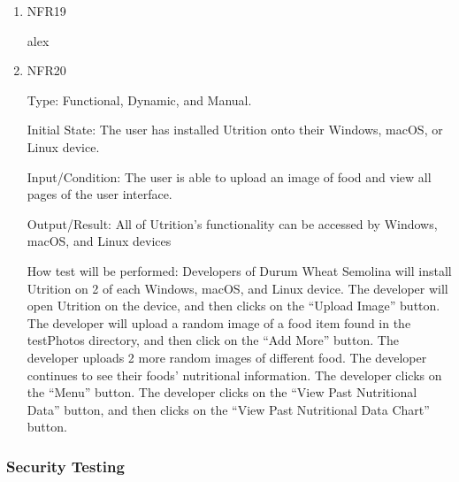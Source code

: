 \documentclass[12pt, titlepage]{article}
\begin{document}
\begin{enumerate}

\item{NFR19\\} 

alex


\item{NFR20\\} 

Type: Functional, Dynamic, and Manual.

Initial State: The user has installed Utrition onto their Windows, macOS, or Linux device.

Input/Condition: The user is able to upload an image of food and view all pages of the user interface.

Output/Result: All of Utrition’s functionality can be accessed by Windows, macOS, and Linux devices

How test will be performed: Developers of Durum Wheat Semolina will install Utrition on 2 of each Windows, macOS, and Linux device. The developer will open Utrition on the device, and then clicks on the “Upload Image” button. The developer will upload a random image of a food item found in the testPhotos directory, and then click on the “Add More” button. The developer uploads 2 more random images of different food. The developer continues to see their foods’ nutritional information. The developer clicks on the “Menu” button. The developer clicks on the “View Past Nutritional Data” button, and then clicks on the “View Past Nutritional Data Chart” button.

\end{enumerate}

\subsubsection{Security Testing}

\end{document}
